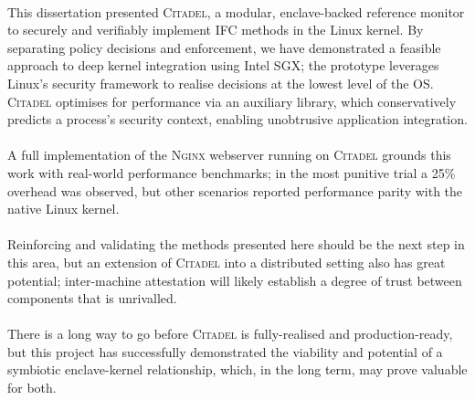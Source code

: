 \paragraph{} This dissertation presented \textsc{Citadel}, a modular, enclave-backed reference monitor to securely and verifiably implement IFC methods in the Linux kernel. By separating policy decisions and enforcement, we have demonstrated a feasible approach to deep kernel integration using Intel SGX; the prototype leverages Linux's security framework to realise decisions at the lowest level of the OS. \textsc{Citadel} optimises for performance via an auxiliary library, which conservatively predicts a process's security context, enabling unobtrusive application integration.

\paragraph{} A full implementation of the \textsc{Nginx} webserver running on \textsc{Citadel} grounds this work with real-world performance benchmarks; in the most punitive trial a 25\% overhead was observed, but other scenarios reported performance parity with the native Linux kernel.

\paragraph{} Reinforcing and validating the methods presented here should be the next step in this area, but an extension of \textsc{Citadel} into a distributed setting also has great potential; inter-machine attestation will likely establish a degree of trust between components that is unrivalled.


\paragraph{} There is a long way to go before \textsc{Citadel} is fully-realised and production-ready, but this project has successfully demonstrated the viability and potential of a symbiotic enclave-kernel relationship, which, in the long term, may prove valuable for both.